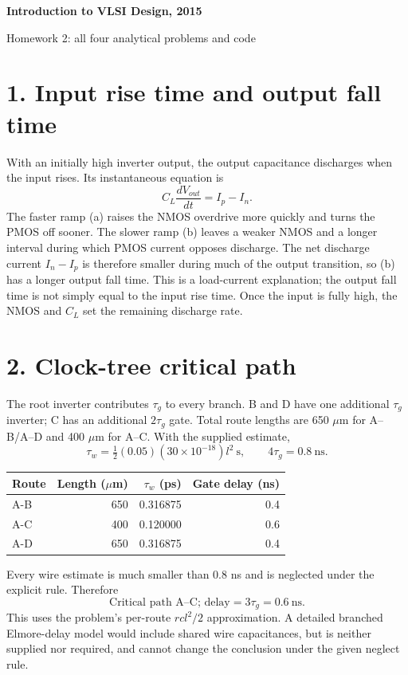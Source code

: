 \documentclass[11pt]{article}
\begin{document}
\begin{center}{\Large\bfseries Introduction to VLSI Design, 2015}\par{\large Homework 2: all four analytical problems and code}\end{center}
\section*{1. Input rise time and output fall time}
With an initially high inverter output, the output capacitance discharges when the input rises. Its instantaneous equation is
\[
C_L\frac{dV_{out}}{dt}=I_p-I_n.
\]
The faster ramp (a) raises the NMOS overdrive more quickly and turns the PMOS off sooner. The slower ramp (b) leaves a weaker NMOS and a longer interval during which PMOS current opposes discharge. The net discharge current $I_n-I_p$ is therefore smaller during much of the output transition, so (b) has a longer output fall time. This is a load-current explanation; the output fall time is not simply equal to the input rise time. Once the input is fully high, the NMOS and $C_L$ set the remaining discharge rate.

\section*{2. Clock-tree critical path}
The root inverter contributes $\tau_g$ to every branch. B and D have one additional $\tau_g$ inverter; C has an additional $2\tau_g$ gate. Total route lengths are 650 $\mu$m for A--B/A--D and 400 $\mu$m for A--C. With the supplied estimate,
\[
\tau_w=\tfrac12(0.05)(30\times10^{-18})l^2\ \mathrm{s},\qquad4\tau_g=0.8\ \mathrm{ns}.
\]
\begin{center}\begin{tabular}{lrrr}\toprule Route&Length ($\mu$m)&$\tau_w$ (ps)&Gate delay (ns)\\\midrule
A-B&650&0.316875&0.4\\
A-C&400&0.120000&0.6\\
A-D&650&0.316875&0.4\\
\bottomrule\end{tabular}\end{center}
Every wire estimate is much smaller than 0.8 ns and is neglected under the explicit rule. Therefore
\[
\boxed{\text{Critical path A--C; delay}=3\tau_g=0.6\ \mathrm{ns}.}
\]
This uses the problem's per-route $rc l^2/2$ approximation. A detailed branched Elmore-delay model would include shared wire capacitances, but is neither supplied nor required, and cannot change the conclusion under the given neglect rule.
\end{document}
